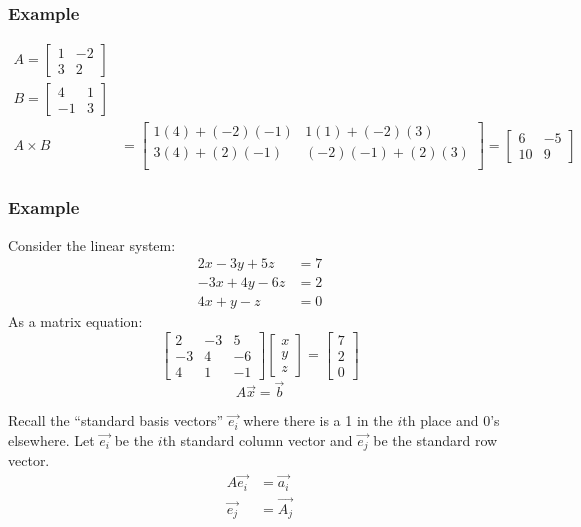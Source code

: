 \documentclass{math}
\begin{document}
\subsubsection*{Example}
\begin{align*}
  A = \begin{bmatrix}1 & -2 \\ 3 & 2\end{bmatrix} \\
  B = \begin{bmatrix}4 & 1 \\ -1 & 3\end{bmatrix} \\
  A\times B &= \begin{bmatrix}
    1(4)+(-2)(-1) & 1(1)+(-2)(3) \\
    3(4)+(2)(-1) & (-2)(-1)+(2)(3) \\
  \end{bmatrix} = \begin{bmatrix}6 & -5 \\ 10 & 9\end{bmatrix}
\end{align*}

\subsubsection*{Example}
Consider the linear system:
\begin{align*}
  2x-3y+5z &= 7 \\
  -3x+4y-6z &= 2 \\
  4x+y-z &= 0
\end{align*}
As a matrix equation:
\[ \begin{bmatrix}
  2 & -3 & 5 \\
  -3 & 4 & -6 \\
  4 & 1 & -1
\end{bmatrix}\begin{bmatrix}
  x \\ y \\ z
\end{bmatrix} = \begin{bmatrix}
  7 \\ 2 \\ 0
\end{bmatrix} \]
\[ A\vec{x} = \vec{b} \]

Recall the ``standard basis vectors'' \( \vec{e_i} \) where there is a 1 in
the \( i \)th place and 0's elsewhere. Let \( \vec{e_i} \) be the \( i \)th
standard column vector and \( \vec{e_j} \) be the standard row vector.
\begin{align*}
  A\vec{e_i} &= \vec{a_i} \\
  \vec{e_j} &= \vec{A_j}
\end{align*}
\end{document}
